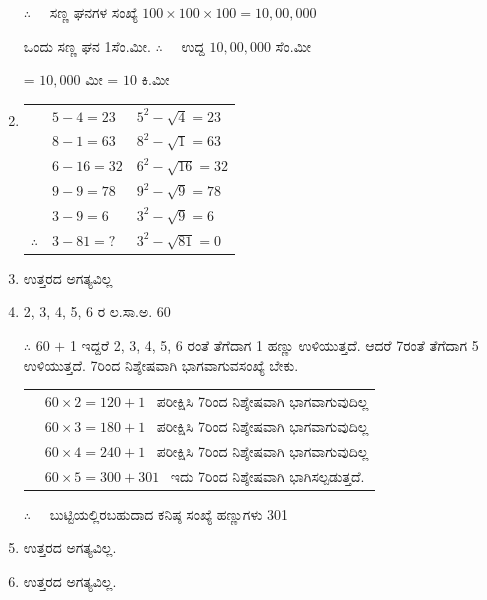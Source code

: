 \begin{enumerate}
\vskip 0.1cm

$\therefore\quad$ ಸಣ್ಣ ಘನಗಳ ಸಂಖ್ಯೆ $100\times 100\times 100 = 10,00,000$

\vskip 0.1cm

ಒಂದು ಸಣ್ಣ ಘನ 1ಸೆಂ.ಮೀ. $\therefore\quad$ ಉದ್ದ $10,00,000$ ಸೆಂ.ಮೀ 

\vskip 0.1cm

= $10,000$ ಮೀ = $10$ ಕಿ.ಮೀ 

\item 
\begin{tabular}[t]{lll}
& $5 - 4 = 23$ & $5^{2} - \sqrt{4} = 23$\\
& $8 - 1 = 63$ & $8^{2} - \sqrt{1} = 63$\\
& $6 - 16 = 32$ & $6^{2} - \sqrt{16} = 32$\\
& $9 - 9 = 78$ & $9^{2} - \sqrt{9} = 78$\\
& $3 - 9 = 6$ & $3^{2} - \sqrt{9} = 6$\\
$\therefore$ & $3 - 81 = ?$ & $3^{2} - \sqrt{81} = 0$
\end{tabular}

\item ಉತ್ತರದ ಅಗತ್ಯವಿಲ್ಲ 

\item 2, 3, 4, 5, 6 ರ ಲ.ಸಾ.ಅ. 60

$\therefore$ 60 $+$ 1 ಇದ್ದರೆ 2, 3, 4, 5, 6 ರಂತೆ ತೆಗೆದಾಗ 1 ಹಣ್ಣು ಉಳಿಯುತ್ತದೆ. ಆದರೆ 7ರಂತೆ ತೆಗೆದಾಗ 5 ಉಳಿಯುತ್ತದೆ. 7ರಿಂದ ನಿಶ್ಶೇಷವಾಗಿ ಭಾಗವಾಗುವ\break ಸಂಖ್ಯೆ ಬೇಕು.

\begin{tabular}{ll}
& $60\times 2 = 120 + 1$  ~ಪರೀಕ್ಷಿಸಿ 7ರಿಂದ ನಿಶ್ಶೇಷವಾಗಿ ಭಾಗವಾಗುವುದಿಲ್ಲ\\
& $60\times 3 = 180 + 1$  ~ಪರೀಕ್ಷಿಸಿ 7ರಿಂದ ನಿಶ್ಶೇಷವಾಗಿ ಭಾಗವಾಗುವುದಿಲ್ಲ\\
& $60\times 4 = 240 + 1$  ~ಪರೀಕ್ಷಿಸಿ 7ರಿಂದ ನಿಶ್ಶೇಷವಾಗಿ ಭಾಗವಾಗುವುದಿಲ್ಲ\\
& $60\times 5 = 300 +  301$  ~ಇದು 7ರಿಂದ ನಿಶ್ಶೇಷವಾಗಿ ಭಾಗಿಸಲ್ಪಡುತ್ತದೆ. 
\end{tabular}

$\therefore\quad$ ಬುಟ್ಟಿಯಲ್ಲಿರಬಹುದಾದ ಕನಿಷ್ಠ ಸಂಖ್ಯೆ ಹಣ್ಣುಗಳು 301

\item ಉತ್ತರದ ಅಗತ್ಯವಿಲ್ಲ.

\item ಉತ್ತರದ ಅಗತ್ಯವಿಲ್ಲ.
\end{enumerate}
